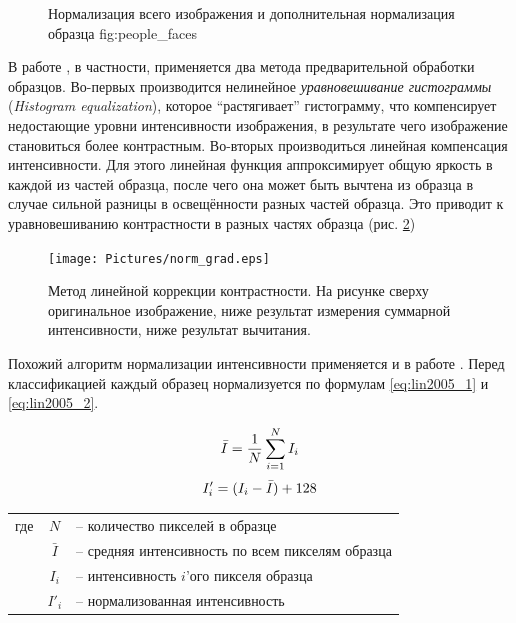 \documentclass[12pt]{report}
\begin{document}
\begin{figure}[h]
	\centering
	\caption{Нормализация всего изображения  и дополнительная нормализация образца \subref
{fig:people_faces}}
	\label{fig:normalize_example}
\end{figure}

В работе \citep{rowley1998neural}, в частности, применяется два метода предварительной обработки образцов. Во-первых 
производится нелинейное \emph{уравновешивание гистограммы} (\textit{Histogram equalization}), которое ``растягивает'' 
гистограмму, что компенсирует недостающие уровни интенсивности изображения, в результате чего изображение становиться 
более контрастным. Во-вторых производиться линейная компенсация интенсивности. Для этого линейная функция 
аппроксимирует общую яркость в каждой из частей образца, после чего она может быть вычтена из образца в случае 
сильной разницы в освещённости разных частей образца. Это приводит к уравновешиванию контрастности в разных частях 
образца (рис. \ref{fig:norm_grad}) 

\begin{figure}[h]
	\centering
	\texttt{[image: Pictures/norm\_grad.eps]}
	\caption{Метод линейной коррекции контрастности. На рисунке сверху оригинальное изображение, ниже результат 
измерения суммарной интенсивности, ниже результат вычитания. \citep{rowley1998neural}}
	\label{fig:norm_grad}
\end{figure}

Похожий алгоритм нормализации интенсивности применяется и в работе \citep{lin2005face}. Перед классификацией каждый 
образец нормализуется по формулам \ref{eq:lin2005_1} и \ref{eq:lin2005_2}.

\begin{equation}
\label{eq:lin2005_1}
\centering
\bar{I}=\frac{1}{N}\sum_{i=1}^{N}I_{i}
\end{equation}
\begin{equation}
\label{eq:lin2005_2}
\centering
{I}'_i=(I_i-\bar{I})+128
\end{equation}

\begin{tabular}{p{3cm} c l}
где & $N$ & -- количество пикселей в образце\\
	& $\bar{I}$ & -- средняя интенсивность по всем пикселям образца\\
	& $I_i$ & -- интенсивность $i$'ого пикселя образца\\
	& ${I}'_i$ & -- нормализованная интенсивность\\
\end{tabular}
\end{document}
